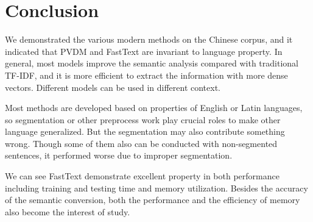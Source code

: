 \section{Conclusion}

We demonstrated the various modern methods on the Chinese corpus, and it indicated that PVDM and FastText are invariant to language property. 
In general, most models improve the semantic analysis compared with traditional TF-IDF, and it is more efficient to extract the information with more dense vectors.
Different models can be used in different context.

Most methods are developed based on properties of English or Latin languages, so segmentation or other preprocess work play crucial roles to make other language generalized.
But the segmentation may also contribute something wrong. Though some of them also can be conducted with non-segmented sentences, it performed worse due to improper segmentation.

We can see FastText demonstrate excellent property in both performance including training and testing time and memory utilization. 
Besides the accuracy of the semantic conversion, both the performance and the efficiency of memory also become the interest of study.

